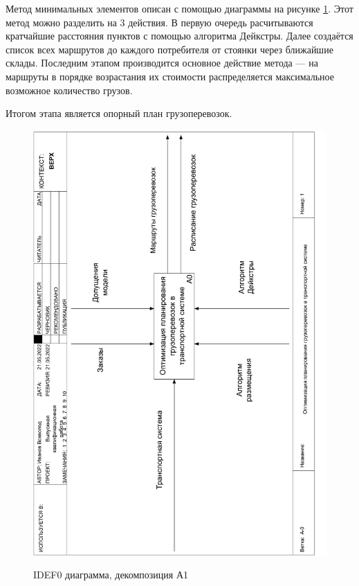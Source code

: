 Метод минимальных элементов описан с помощью диаграммы на рисунке \ref{idef0:A1}. Этот метод можно разделить на 3 действия. В первую очередь расчитываются кратчайшие расстояния пунктов с помощью алгоритма Дейкстры. Далее создаётся список всех маршрутов до каждого потребителя от стоянки через ближайшие склады. Последним этапом производится основное действие метода --- на маршруты в порядке возрастания их стоимости распределяется максимальное возможное количество грузов. 

Итогом этапа является опорный план грузоперевозок.

\pagebreak
\begin{figure}[h]
	\begin{center}
		{\includegraphics[scale=0.63, angle=-90, page=3]{img/idef0.pdf}}
		\caption{IDEF0 диаграмма, декомпозиция А1}
		\label{idef0:A1}
	\end{center}
\end{figure}

